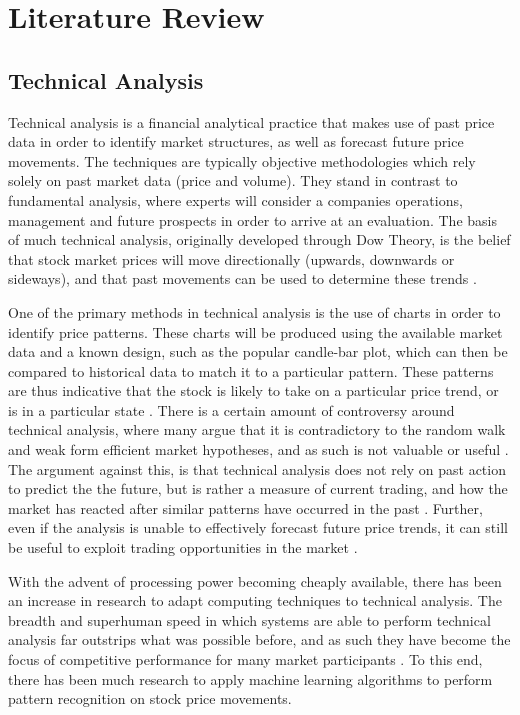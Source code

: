 \documentclass[a4paper,11pt,oneside]{article}
\theoremstyle{plain}
\theoremstyle{definition}
\begin{document}
	
	
	\newpage
	\section{Literature Review}\label{lr_LiteratureReview}
	\subsection{Technical Analysis}\label{lr_TechnicalAnalysis}
	
	Technical analysis is a financial analytical practice that makes use of past price data in order to identify market 
	structures, as well as forecast future price movements. The techniques are typically objective methodologies 
	which rely solely on past market data (price and volume). They stand in contrast to fundamental analysis, where 
	experts will consider a companies operations, management and future prospects in order to arrive at an evaluation. 
	The basis of much technical analysis, originally developed through Dow Theory, is the belief that stock market 
	prices will move directionally (upwards, downwards or sideways), and that past movements can be used to 
	determine these trends  \cite {Murphy}.
	\hfill \break 
	
	One of the primary methods in technical analysis is the use of charts in order to identify price patterns. 
	These charts will be produced using the available market data and a known design, such as the popular candle-bar 
	plot, which can then be compared to historical data to match it to a particular pattern. These patterns are thus 
	indicative that the stock is likely to take on a particular price trend, or is in a particular state \cite {Murphy}.  
	There is a certain amount of controversy around technical analysis, where many argue that it is contradictory 
	to the random walk and weak form efficient market hypotheses, and as such is not valuable or useful \cite {Griffioen}. 
	The argument against this, is that technical analysis does not rely on past action to predict the the future, but is 
	rather a measure of current trading, and how the market has reacted after similar patterns have occurred in the 
	past \cite {Kahn}. Further, even if the analysis is unable to effectively forecast future price trends, it can still be useful 
	to exploit trading opportunities in the market \cite{Schwager}.
	\hfill \break 
	
	With the advent of processing power becoming cheaply available, there has been an increase in research to 
	adapt computing techniques to technical analysis. The breadth and superhuman speed in which systems are 
	able to perform technical analysis far outstrips what was possible before, and as such they have become the 
	focus of competitive performance for many market participants \cite {Johnson}. To this end, there has been much 
	research to apply machine learning algorithms to perform pattern recognition on stock price movements.
	\hfill \break
	
\end{document}

